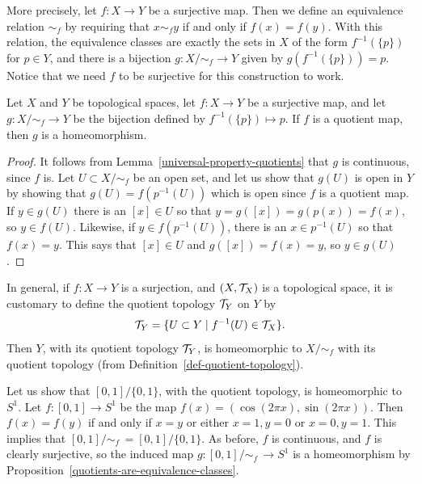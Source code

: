 More precisely, let $f :X \to Y$ be a surjective map. Then we define an equivalence relation $\sim_f$ by requiring that $x \sim_f y$ if and only if $f(x) = f(y)$. With this relation, the equivalence classes are exactly the sets in $X$ of the form $f^{-1}(\{p\})$ for $p \in Y$, and there is a bijection $g: X/\!\sim_f \to Y$ given by $g(f^{-1}(\{p\})) = p$. Notice that we need $f$ to be surjective for this construction to work.
\begin{prop}
  \label{quotients-are-equivalence-classes}
  Let $X$ and $Y$ be topological spaces, let $f : X \to Y$ be a surjective map, and let $g : X/ \!\sim_f \to Y$ be the bijection defined by $f^{-1}(\{p\}) \mapsto p$. If $f$ is a quotient map, then $g$ is a homeomorphism.
\end{prop}
\begin{proof}
  It follows from Lemma~\ref{universal-property-quotients} that $g$ is continuous, since $f$ is. Let $U \subset X/\!\sim_f$ be an open set, and let us show that $g(U)$ is open in $Y$ by showing that $g(U) = f(p^{-1}(U))$ which is open since $f$ is a quotient map. If $y \in g(U)$ there is an $[x] \in U$ so that $y = g([x]) = g(p(x)) = f(x)$, so $y \in f(U)$. Likewise, if $y \in f(p^{-1}(U))$, there is an $x \in p^{-1}(U)$ so that $f(x) = y$. This says that $[x] \in U$ and $g([x]) = f(x) = y$, so $y \in g(U)$.
\end{proof}
\begin{rem}
  In general, if $f : X \to Y$ is a surjection, and $(X,\mathcal{T}_X)$ is a topological space, it is customary to define the quotient topology $\mathcal{T}_Y$ on $Y$ by
  \[
    \mathcal{T}_Y = \{ U \subset Y \mid f^{-1}(U) \in \mathcal{T}_X \}.
  \]
  Then $Y$, with its quotient topology $\mathcal{T}_Y$, is homeomorphic to $X/\!\sim_f$ with its quotient topology (from Definition~\ref{def-quotient-topology}).
\end{rem}
\begin{example}
  \label{circle-from-interval}
  Let us show that $[0,1]/\{0,1\}$, with the quotient topology, is homeomorphic to $S^1$. Let $f : [0,1] \to S^1$ be the map $f(x) = (\cos(2\pi x), \sin(2\pi x))$. Then $f(x) = f(y)$ if and only if $x = y$ or either $x=1,y=0$ or $x=0,y=1$. This implies that $[0,1]/\!\sim_f\, = [0,1]/\{0,1\}$. As before, $f$ is continuous, and $f$ is clearly surjective, so the induced map $g : [0,1]/\!\sim_f \,\to S^1$ is a homeomorphism by Proposition~\ref{quotients-are-equivalence-classes}.
\end{example}
